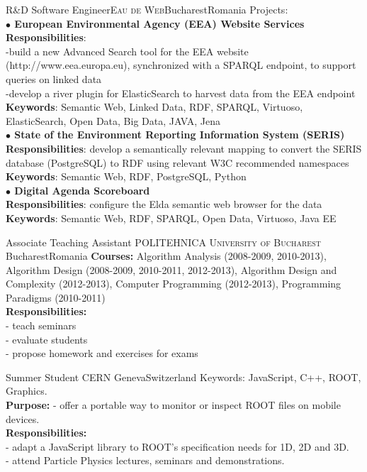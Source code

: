 \documentclass[11pt,a4paper,sans]{moderncv}
\begin{document}
{R\&D Software Engineer}{\textsc{Eau de Web}}{Bucharest}{Romania}
{Projects: \\ 
\textbf{ $\bullet$ European Environmental Agency (EEA) Website Services } \\ 
\textbf{Responsibilities}: \\ 
-build a new Advanced Search tool for the EEA website (http://www.eea.europa.eu), 
synchronized with a SPARQL endpoint, to support queries on linked data \\ 
-develop a river plugin for ElasticSearch to harvest data from the EEA endpoint \\
\textbf{Keywords}: Semantic Web, Linked Data, RDF, SPARQL, Virtuoso, 
ElasticSearch, Open Data, Big Data, JAVA, Jena \\
\textbf{ $\bullet$ State of the Environment Reporting Information System (SERIS) } \\
\textbf{Responsibilities}: develop a semantically relevant mapping to convert 
the SERIS database (PostgreSQL) 
to RDF using relevant W3C recommended namespaces  \\
\textbf{Keywords}: Semantic Web, RDF, PostgreSQL, Python\\ 
\textbf{ $\bullet$ Digital Agenda Scoreboard } \\ 
\textbf{Responsibilities}: configure the Elda semantic web browser for the data \\ 
\textbf{Keywords}: Semantic Web, RDF, SPARQL, Open Data, Virtuoso, Java EE }

{Associate Teaching Assistant}
{\textsc{POLITEHNICA University of Bucharest}}
{Bucharest}{Romania}
{ \textbf{Courses:} Algorithm Analysis (2008-2009, 2010-2013), 
Algorithm Design (2008-2009, 2010-2011, 2012-2013), 
Algorithm Design and Complexity (2012-2013), 
Computer Programming (2012-2013), 
Programming Paradigms (2010-2011)  \\ 
\textbf{Responsibilities:} \\  
- teach seminars \\ 
- evaluate students \\ 
- propose homework and exercises for exams}


{Summer Student}
{\textsc{CERN}}
{Geneva}{Switzerland}
{ Keywords: JavaScript, C++, ROOT, Graphics. \\ 
\textbf{Purpose:}  
- offer a portable way to monitor or inspect ROOT files on mobile devices. \\ 
\textbf{Responsibilities:} \\ 
- adapt a JavaScript library to ROOT's specification needs for 1D, 2D and 3D. \\ 
- attend Particle Physics lectures, seminars and demonstrations. }
\end{document}
